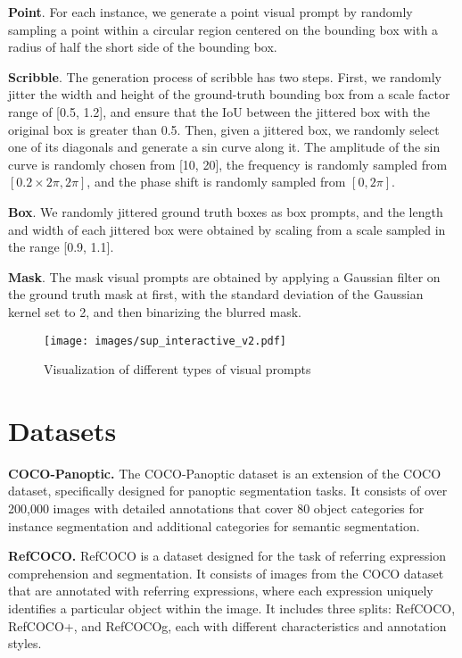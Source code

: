 \noindent\textbf{Point}. For each instance, we generate a point visual prompt by randomly sampling a point within a circular region centered on the bounding box with a radius of half the short side of the bounding box.  

\noindent\textbf{Scribble}. The generation process of scribble has two steps. First, we randomly jitter the width and height of the ground-truth bounding box from a scale factor range of [0.5, 1.2], and ensure that the IoU between the jittered box with the original box is greater than 0.5. Then, given a jittered box, we randomly select one of its diagonals and generate a sin curve along it. The amplitude of the sin curve is randomly chosen from [10, 20], the frequency is randomly sampled from \([0.2 \times 2\pi, 2\pi]\), and the phase shift is randomly sampled from \([0, 2\pi]\). 

\noindent\textbf{Box}. We randomly jittered ground truth boxes as box prompts, and the length and width of each jittered box were obtained by scaling from a scale sampled in the range [0.9, 1.1].

\noindent\textbf{Mask}. The mask visual prompts are obtained by applying a Gaussian filter on the ground truth mask at first, with the standard deviation of the Gaussian kernel set to 2, and then binarizing the blurred mask. 

\setcounter{figure}{3}

\begin{figure}[!t]
  \centering
  \texttt{[image: images/sup\_interactive\_v2.pdf]}
  \caption{Visualization of different types of visual prompts}
  \label{fig:interactive}
\end{figure}
\section{Datasets}
\noindent\textbf{COCO-Panoptic.} The COCO-Panoptic dataset is an extension of the COCO dataset, specifically designed for panoptic segmentation tasks. It consists of over 200,000 images with detailed annotations that cover 80 object categories for instance segmentation and additional categories for semantic segmentation. 

\noindent\textbf{RefCOCO.} RefCOCO is a dataset designed for the task of referring expression comprehension and segmentation. It consists of images from the COCO dataset that are annotated with referring expressions, where each expression uniquely identifies a particular object within the image. It includes three splits: RefCOCO, RefCOCO+, and RefCOCOg, each with different characteristics and annotation styles.

